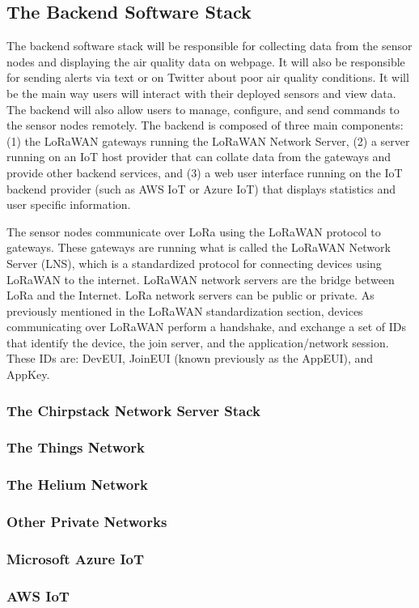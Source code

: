 \subsection{The Backend Software Stack}
The backend software stack will be responsible for collecting data from the
sensor nodes and displaying the air quality data on webpage. It will also be
responsible for sending alerts via text or on Twitter about poor air quality
conditions. It will be the main way users will interact with their deployed
sensors and view data. The backend will also allow users to manage, configure,
and send commands to the sensor nodes remotely. The backend is composed of three
main components: (1) the LoRaWAN gateways running the LoRaWAN Network Server,
(2) a server running on an IoT host provider that can collate data from the
gateways and provide other backend services, and (3) a web user interface
running on the IoT backend provider (such as AWS IoT or Azure IoT) that displays
statistics and user specific information.

The sensor nodes communicate over LoRa using the LoRaWAN protocol to gateways.
These gateways are running what is called the LoRaWAN Network Server (LNS),
which is a standardized protocol for connecting devices using LoRaWAN to the
internet.  LoRaWAN network servers are the bridge between LoRa and the Internet.
LoRa network servers can be public or private. As previously mentioned in the
LoRaWAN standardization section, devices communicating over LoRaWAN perform a
handshake, and exchange a set of IDs that identify the device, the join server,
and the application/network session. These IDs are: DevEUI, JoinEUI (known
previously as the AppEUI), and AppKey.

\subsubsection{The Chirpstack Network Server Stack}
\subsubsection{The Things Network}
\subsubsection{The Helium Network}
\subsubsection{Other Private Networks}
\subsubsection{Microsoft Azure IoT}
\subsubsection{AWS IoT}

